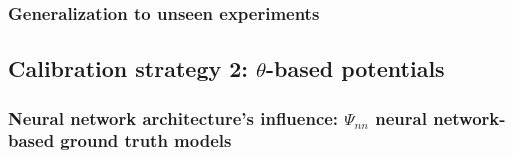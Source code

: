 \subsubsection{Generalization to unseen experiments}





\clearpage


\subsection{Calibration strategy 2: $\theta$-based potentials}


\subsubsection{Neural network architecture's influence: $\Psi_{nn}$ neural network-based ground truth models}


